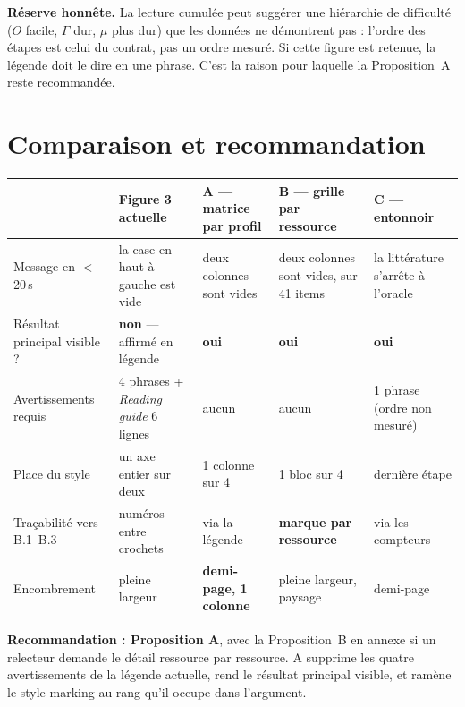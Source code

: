 \documentclass[10pt]{article}
\begin{document}
\medskip
\noindent\textbf{R\'eserve honn\^ete.} La lecture cumul\'ee peut sugg\'erer une hi\'erarchie de difficult\'e
($O$ facile, $\Gamma$ dur, $\mu$ plus dur) que les donn\'ees ne d\'emontrent pas : l'ordre des \'etapes est
celui du contrat, pas un ordre mesur\'e. Si cette figure est retenue, la l\'egende doit le dire en une phrase.
C'est la raison pour laquelle la Proposition~A reste recommand\'ee.

\clearpage

\section*{Comparaison et recommandation}

\noindent
\begin{tabular}{@{}p{2.4cm}p{4.1cm}p{4.1cm}p{4.1cm}p{4.1cm}@{}}
\toprule
& \textbf{Figure 3 actuelle} & \textbf{A --- matrice par profil} & \textbf{B --- grille par ressource} & \textbf{C --- entonnoir}\\
\midrule
Message en $<$20\,s
& la case en haut \`a gauche est vide
& deux colonnes sont vides
& deux colonnes sont vides, sur 41 items
& la litt\'erature s'arr\^ete \`a l'oracle\\
\addlinespace
R\'esultat principal visible ?
& \textbf{non} --- affirm\'e en l\'egende
& \textbf{oui}
& \textbf{oui}
& \textbf{oui}\\
\addlinespace
Avertissements requis
& 4 phrases + \emph{Reading guide} 6 lignes
& aucun
& aucun
& 1 phrase (ordre non mesur\'e)\\
\addlinespace
Place du style
& un axe entier sur deux
& 1 colonne sur 4
& 1 bloc sur 4
& derni\`ere \'etape\\
\addlinespace
Tra\c cabilit\'e vers B.1--B.3
& num\'eros entre crochets
& via la l\'egende
& \textbf{marque par ressource}
& via les compteurs\\
\addlinespace
Encombrement
& pleine largeur
& \textbf{demi-page, 1 colonne}
& pleine largeur, paysage
& demi-page\\
\bottomrule
\end{tabular}

\vspace{10pt}
\noindent\textbf{Recommandation : Proposition A}, avec la Proposition~B en annexe si un relecteur demande
le d\'etail ressource par ressource. A supprime les quatre avertissements de la l\'egende actuelle, rend le
r\'esultat principal visible, et ram\`ene le style-marking au rang qu'il occupe dans l'argument.
\end{document}
